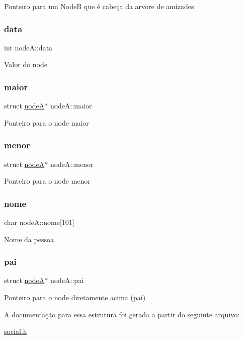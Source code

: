 Ponteiro para um NodeB que é cabeça da arvore de amizades \mbox{\label{structnodeA_ad3adb17ccc0d5912b4642e49b7f2cf91}} 
\subsubsection{\texorpdfstring{data}{data}}
{\footnotesize\ttfamily int node\+A\+::data}

Valor do node \mbox{\label{structnodeA_af3a6276035abe3f5912b42d5334b84f2}} 
\subsubsection{\texorpdfstring{maior}{maior}}
{\footnotesize\ttfamily struct \mbox{\hyperlink{structnodeA}{nodeA}}$\ast$ node\+A\+::maior}

Ponteiro para o node maior \mbox{\label{structnodeA_a240c2a666e348701276be151d0dc6f9a}} 
\subsubsection{\texorpdfstring{menor}{menor}}
{\footnotesize\ttfamily struct \mbox{\hyperlink{structnodeA}{nodeA}}$\ast$ node\+A\+::menor}

Ponteiro para o node menor \mbox{\label{structnodeA_abb21dead329c9c152aaf2544337b26d7}} 
\subsubsection{\texorpdfstring{nome}{nome}}
{\footnotesize\ttfamily char node\+A\+::nome\mbox{[}101\mbox{]}}

Nome da pessoa \mbox{\label{structnodeA_a0ff9bb5e43589704c3ce4eb4434d76af}} 
\subsubsection{\texorpdfstring{pai}{pai}}
{\footnotesize\ttfamily struct \mbox{\hyperlink{structnodeA}{nodeA}}$\ast$ node\+A\+::pai}

Ponteiro para o node diretamente acima (pai) 

A documentação para essa estrutura foi gerada a partir do seguinte arquivo\+:\begin{DoxyCompactItemize}
\item 
\mbox{\hyperlink{social_8h}{social.\+h}}\end{DoxyCompactItemize}
